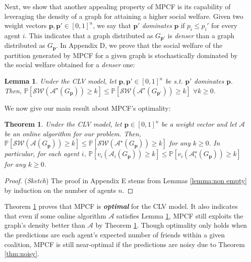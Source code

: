 \documentclass[letterpaper]{article} %
\newtheorem{theorem}{Theorem}
\newtheorem{lemma}{Lemma}
\begin{document}
Next, we show that another appealing property of MPCF is its capability of leveraging the density of a graph for attaining a higher social welfare. Given two weight vectors $\mathbf{p}, \mathbf{p}' \in [0,1]^n$, we say that $\mathbf{p}'$ \textit{dominates} $\mathbf{p}$ if $p_i \leq p_i'$ for every agent $i$. This indicates that a graph distributed as ${G}_{\mathbf{p}'}$ is \textit{denser} than a graph distributed as ${G}_{\mathbf{p}}$. In Appendix D, we prove that the social welfare of the partition generated by MPCF for a given graph is stochastically dominated by the social welfare obtained for a \textit{denser} one:
\begin{lemma}
    \label{lemma:dominates}
    Under the CLV model, let $\mathbf{p}, \mathbf{p}' \in [0,1]^n$ be s.t. $\mathbf{p}'$ dominates $\mathbf{p}$. Then, $\mathbb{P}[\mathcal{SW}(\mathcal{A}^\star(G_{\mathbf{p}})) \geq k] \leq \mathbb{P}[\mathcal{SW}(\mathcal{A}^\star(G_{\mathbf{p}'})) \geq k]$ $\forall k \geq 0$.
\end{lemma}

We now give our main result about MPCF's optimality:

\begin{theorem}
    \label{thm:MPCF is optimal}
    Under the CLV model, let $\mathbf{p} \in [0,1]^n$ be a weight vector and let $\mathcal{A}$ be an online algorithm for our problem. Then, $\mathbb{P}[\mathcal{SW}(\mathcal{A}(G_{\mathbf{p}})) \geq k] \leq \mathbb{P}[\mathcal{SW}(\mathcal{A}^\star(G_{\mathbf{p}})) \geq k]$ for any $k \geq 0$. In particular, for each agent $i$, $\mathbb{P}[v_i(\mathcal{A}_i(G_{\mathbf{p}})) \geq k] \leq \mathbb{P}[v_i(\mathcal{A}^\star_i(G_{\mathbf{p}})) \geq k]$ for any $k \geq 0$.
\end{theorem}
\begin{proof}
    (\textit{Sketch})
    The proof in Appendix E stems from Lemmas \ref{lemma:non empty} by induction on the number of agents $n$.
\end{proof}

Theorem \ref{thm:MPCF is optimal} proves that MPCF is \textit{\textbf{optimal}} for the CLV model. It also indicates that even if some online algorithm $\mathcal{A}$ satisfies Lemma \ref{lemma:dominates}, MPCF still exploits the graph's density better than $\mathcal{A}$ by Theorem \ref{thm:MPCF is optimal}. Though optimality only holds when the predictions are each agent's expected number of friends within a given coalition, MPCF is still near-optimal if the predictions are noisy due to Theorem \ref{thm:noisy}.
\end{document}
